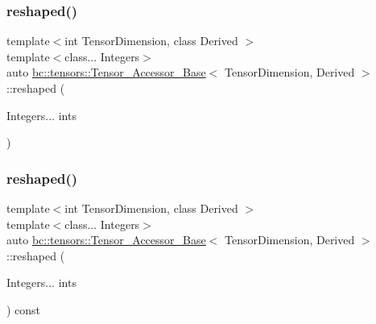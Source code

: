 \mbox{\label{classbc_1_1tensors_1_1Tensor__Accessor__Base_a1bdaf5e74a6c2971415038d0aeb628ba}} 
\subsubsection{\texorpdfstring{reshaped()}{reshaped()}\hspace{0.1cm}{\footnotesize\ttfamily [3/4]}}
{\footnotesize\ttfamily template$<$int Tensor\+Dimension, class Derived $>$ \\
template$<$class... Integers$>$ \\
auto \hyperlink{classbc_1_1tensors_1_1Tensor__Accessor__Base}{bc\+::tensors\+::\+Tensor\+\_\+\+Accessor\+\_\+\+Base}$<$ Tensor\+Dimension, Derived $>$\+::reshaped (\begin{DoxyParamCaption}\item[{Integers...}]{ints }\end{DoxyParamCaption})\hspace{0.3cm}{\ttfamily [inline]}}

\mbox{\label{classbc_1_1tensors_1_1Tensor__Accessor__Base_a108c62c1f1ce839bdf080cffa8257fc7}} 
\subsubsection{\texorpdfstring{reshaped()}{reshaped()}\hspace{0.1cm}{\footnotesize\ttfamily [4/4]}}
{\footnotesize\ttfamily template$<$int Tensor\+Dimension, class Derived $>$ \\
template$<$class... Integers$>$ \\
auto \hyperlink{classbc_1_1tensors_1_1Tensor__Accessor__Base}{bc\+::tensors\+::\+Tensor\+\_\+\+Accessor\+\_\+\+Base}$<$ Tensor\+Dimension, Derived $>$\+::reshaped (\begin{DoxyParamCaption}\item[{Integers...}]{ints }\end{DoxyParamCaption}) const\hspace{0.3cm}{\ttfamily [inline]}}

